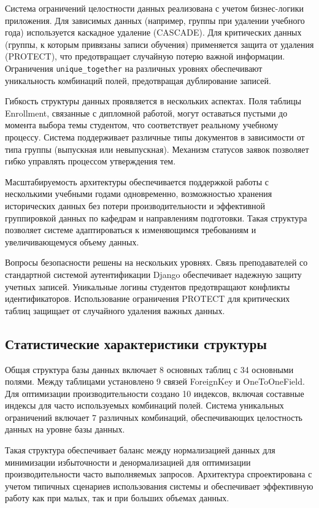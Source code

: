\documentclass[a4paper,12pt]{article}
\begin{document}
Система ограничений целостности данных реализована с учетом бизнес-логики приложения. Для зависимых данных (например, группы при удалении учебного года) используется каскадное удаление (CASCADE). Для критических данных (группы, к которым привязаны записи обучения) применяется защита от удаления (PROTECT), что предотвращает случайную потерю важной информации. Ограничения \texttt{unique\_together} на различных уровнях обеспечивают уникальность комбинаций полей, предотвращая дублирование записей.

Гибкость структуры данных проявляется в нескольких аспектах. Поля таблицы Enrollment, связанные с дипломной работой, могут оставаться пустыми до момента выбора темы студентом, что соответствует реальному учебному процессу. Система поддерживает различные типы документов в зависимости от типа группы (выпускная или невыпускная). Механизм статусов заявок позволяет гибко управлять процессом утверждения тем.

Масштабируемость архитектуры обеспечивается поддержкой работы с несколькими учебными годами одновременно, возможностью хранения исторических данных без потери производительности и эффективной группировкой данных по кафедрам и направлениям подготовки. Такая структура позволяет системе адаптироваться к изменяющимся требованиям и увеличивающемуся объему данных.

Вопросы безопасности решены на нескольких уровнях. Связь преподавателей со стандартной системой аутентификации Django обеспечивает надежную защиту учетных записей. Уникальные логины студентов предотвращают конфликты идентификаторов. Использование ограничения PROTECT для критических таблиц защищает от случайного удаления важных данных.

\subsection{Статистические характеристики структуры}

Общая структура базы данных включает 8 основных таблиц с 34 основными полями. Между таблицами установлено 9 связей ForeignKey и OneToOneField. Для оптимизации производительности создано 10 индексов, включая составные индексы для часто используемых комбинаций полей. Система уникальных ограничений включает 7 различных комбинаций, обеспечивающих целостность данных на уровне базы данных.

Такая структура обеспечивает баланс между нормализацией данных для минимизации избыточности и денормализацией для оптимизации производительности часто выполняемых запросов. Архитектура спроектирована с учетом типичных сценариев использования системы и обеспечивает эффективную работу как при малых, так и при больших объемах данных.
\end{document}
